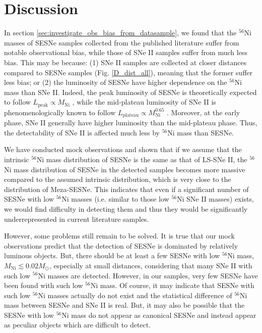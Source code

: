 \documentclass[twocolumn, linenumbers]{aastex62}
\begin{document}
\section{Discussion} \label{sec:discussion}
In section \ref{sec:investigate_obs_bias_from_datasample}, we found that the $^{56}$Ni masses of SESNe samples collected from the published literature suffer from notable observational bias, while those of SNe II samples suffer from much less bias. This may be because: (1) SNe II samples are collected at closer distances compared to SESNe samples (Fig. \ref{D_dist_all}), meaning that the former suffer less bias; or (2) the luminosity of SESNe have higher dependence on the $^{56}$Ni mass than SNe II. Indeed, the peak luminosity of SESNe is theoretically expected to follow $L_{\mathrm{peak}}\propto M_{\mathrm{Ni}}$ \citep{1982ApJ...253..785A}, while the mid-plateau luminosity of SNe II is phenomenologically known to follow $L_{\mathrm{plateau}} \propto M_{\mathrm{Ni}}^{0.65}$ \citep{2015ApJ...806..225P}. Moreover, at the early phase, SNe II generally have higher luminosity than the mid-plateau phase. Thus, the detectability of SNe II is affected much less by $^{56}$Ni mass than SESNe.  

We have conducted mock observations and shown that if we assume that the intrinsic $^{56}$Ni mass distribution of SESNe is the same as that of LS-SNe II, the $^{56}$Ni mass distribution of SESNe in the detected samples becomes more massive compared to the assumed intrinsic distribution, which is very close to the distribution of Meza-SESNe. 
This indicates that even if a significant number of SESNe with low $^{56}$Ni masses (i.e. similar to those low $^{56}$Ni SNe II masses) exists, we would find difficulty in detecting them and thus they would be significantly underrepresented in current literature samples.

However, some problems still remain to be solved. It is true that our mock observations predict that the detection of SESNe is dominated by relatively luminous objects. But, there should be at least a few SESNe with low $^{56}$Ni mass, $M_{\mathrm{Ni}} \lesssim 0.02 M_{\odot}$,  especially at small distances, considering that many SNe II with such low $^{56}$Ni masses are detected. However, in our samples, very few SESNe have been found with such low $^{56}$Ni mass. Of course, it may indicate that SESNe with such low $^{56}$Ni masses actually do not exist and the statistical difference of $^{56}$Ni mass between SESNe and SNe II is real. But, it may also be possible that the SESNe with low $^{56}$Ni mass  do not appear as canonical SESNe and instead appear as peculiar objects which are difficult to detect.
\end{document}
